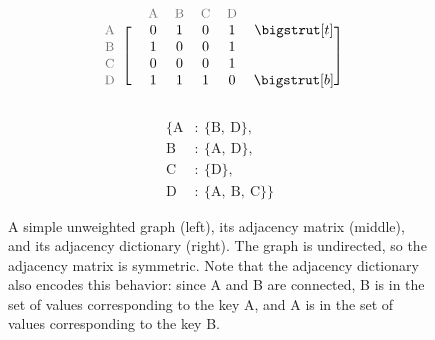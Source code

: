 \begin{figure}[H] %
\captionsetup[subfigure]{justification=centering}
\centering
\begin{subfigure}{.32\textwidth}
\centering
{}
\end{subfigure}
%
\begin{subfigure}{.32\textwidth}
\centering
\begin{align*}
    \begin{blockarray}{ccccccc}
    & & \small\text{\textcolor{gray}{A}} & \small\text{\textcolor{gray}{B}} & \small\text{\textcolor{gray}{C}} & \small\text{\textcolor{gray}{D}} & \\
    \begin{block}{c[cccccc]}
    \small\text{\textcolor{gray}{A}} & & 0 & 1 & 0 & 1 & \topstrut\\
    \small\text{\textcolor{gray}{B}} & & 1 & 0 & 0 & 1 & \\
    \small\text{\textcolor{gray}{C}} & & 0 & 0 & 0 & 1 & \\
    \small\text{\textcolor{gray}{D}} & & 1 & 1 & 1 & 0 & \botstrut\\
    \end{block}\end{blockarray}
\end{align*}
\end{subfigure}
%
\begin{subfigure}{.32\textwidth}
\centering
\begin{align*}
\{\text{A}&:\ \{\text{B},\ \text{D}\},\\
  \text{B}&:\ \{\text{A},\ \text{D}\},\\
  \text{C}&:\ \{\text{D}\},\\
  \text{D}&:\ \{\text{A},\ \text{B},\ \text{C}\}\}
\end{align*}
\end{subfigure}
\caption{A simple unweighted graph (left), its adjacency matrix (middle), and its adjacency dictionary (right).
The graph is undirected, so the adjacency matrix is symmetric.
Note that the adjacency dictionary also encodes this behavior: since A and B are connected, B is in the set of values corresponding to the key A, and A is in the set of values corresponding to the key B.}
\label{fig:bfs-simple-graph}
\end{figure}

